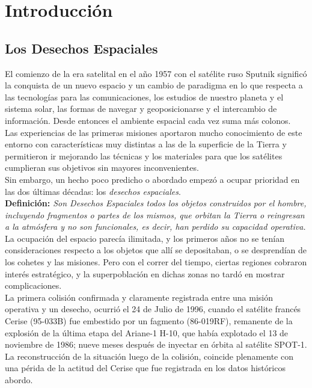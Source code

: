 \chapter{Introducción}
\label{chap:introduccion}


\section{Los Desechos Espaciales}

El comienzo de la era satelital en el a\~no 1957 con el sat\'elite ruso Sputnik signific\'o la conquista de un nuevo espacio y un cambio de paradigma en lo que respecta a las tecnolog\'ias para las comunicaciones, los estudios de nuestro planeta y el sistema solar, las formas de navegar y geoposicionarse y el intercambio de informaci\'on. Desde entonces el ambiente espacial cada vez suma m\'as colonos.\\

Las experiencias de las primeras misiones aportaron mucho conocimiento de este entorno con caracter\'isticas muy distintas a las de la superficie de la Tierra y permitieron ir mejorando las t\'ecnicas y los materiales para que los sat\'elites cumplieran sus objetivos sin mayores inconvenientes.\\
Sin embargo, un hecho poco predicho o abordado empez\'o a ocupar prioridad en las dos \'ultimas d\'ecadas: los {\it{desechos espaciales}}.\\

{\bf{Definici\'on:}}{\it{ Son Desechos Espaciales todos los objetos construidos por el hombre, incluyendo fragmentos o partes de los mismos, que orbitan la Tierra o reingresan a la atm\'osfera y no son funcionales, es decir, han perdido su capacidad operativa.}} \citep{iadcguide}\\

La ocupaci\'on del espacio parec\'ia ilimitada, y los primeros a\~nos no se ten\'ian consideraciones respecto a los objetos que all\'i se depositaban, o se desprend\'ian de los cohetes y las misiones. Pero con el correr del tiempo, ciertas regiones cobraron inter\' es estrat\'egico, y la superpoblaci\' on en dichas zonas no tard\'o en mostrar complicaciones.\\

La primera colisi\'on confirmada y claramente registrada entre una misi\'on operativa y un desecho, ocurri\'o el 24 de Julio de 1996, cuando el sat\'elite franc\'es Cerise (95-033B) fue embestido por un fagmento (86-019RF), remanente de la explosi\'on de la \'ultima etapa del Ariane-1 H-10, que hab\'ia explotado el 13 de noviembre de 1986; nueve meses despu\'es de inyectar en \'orbita al sat\'elite SPOT-1. La reconstrucci\'on de la situaci\'on luego de la colisi\'on, coincide plenamente con una p\'erida de la actitud del Cerise que fue registrada en los datos hist\'oricos abordo. \citep{KlinkradChapter8}\\

